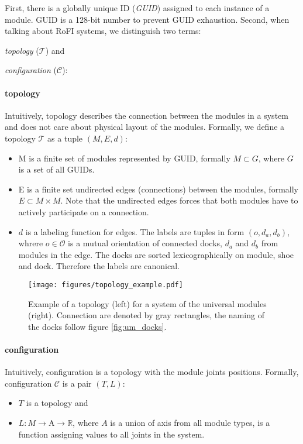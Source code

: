 First, there is a globally unique ID (\emph{GUID}) assigned to each instance of
a module. GUID is a 128-bit number to prevent GUID exhaustion. Second, when
talking about RoFI systems, we distinguish two terms:
\begin{enumerate*}
    \item \emph{topology} ($\mathcal{T}$) and
    \item \emph{configuration} ($\mathcal{C}$):
\end{enumerate*}

\paragraph{topology} Intuitively, topology describes the connection between the
modules in a system and does not care about physical layout of the modules.
Formally, we define a topology $\mathcal{T}$ as a tuple $(M, E, d)$:
\begin{itemize}
    \item M is a finite set of modules represented by GUID, formally $M\subset
    G$, where $G$ is a set of all GUIDs.
    \item E is a finite set undirected edges (connections) between the modules,
    formally $E\subset M\times M$. Note that the undirected edges forces that
    both modules have to actively participate on a connection.
    \item $d$ is a labeling function for edges. The labels are tuples in form
    $(o, d_a, d_b)$, whrere $o\in\mathcal{O}$ is a mutual orientation of
    connected docks, $d_a$ and $d_b$ from modules in the edge. The docks are
    sorted lexicographically on module, shoe and dock. Therefore the labels are
    canonical.
\end{itemize}

\begin{figure}[h!]
    \centering
    \texttt{[image: figures/topology\_example.pdf]}
    \caption{Example of a topology (left) for a system of the universal modules
    (right). Connection are denoted by gray rectangles, the naming of the docks
    follow figure \ref{fig:um_docks}. }
    \label{fig:topology_example}
\end{figure}

\paragraph{configuration} Intuitively, configuration is a topology with the
 module joints positions. Formally, configuration $\mathcal{C}$ is a pair $(T,
 L)$:
 \begin{itemize}
    \item $T$ is a topology and
    \item $L: M \rightarrow \text{A} \rightarrow \mathds{R}$, where $A$ is a
    union of axis from all module types, is a function assigning values to all
    joints in the system.
 \end{itemize}

